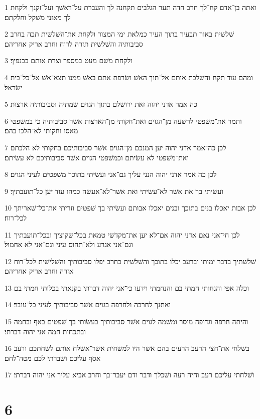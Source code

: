 \par 1 ואתה בן־אדם קח־לך חרב חדה תער הגלבים תקחנה לך והעברת על־ראשׁך ועל־זקנך ולקחת לך מאזני משׁקל וחלקתם׃
\par 2 שׁלשׁית באור תבעיר בתוך העיר כמלאת ימי המצור ולקחת את־השׁלשׁית תכה בחרב סביבותיה והשׁלשׁית תזרה לרוח וחרב אריק אחריהם׃
\par 3 ולקחת משׁם מעט במספר וצרת אותם בכנפיך׃
\par 4 ומהם עוד תקח והשׁלכת אותם אל־תוך האשׁ ושׂרפת אתם באשׁ ממנו תצא־אשׁ אל־כל־בית ישׂראל׃
\par 5 כה אמר אדני יהוה זאת ירושׁלם בתוך הגוים שׂמתיה וסביבותיה ארצות׃
\par 6 ותמר את־משׁפטי לרשׁעה מן־הגוים ואת־חקותי מן־הארצות אשׁר סביבותיה כי במשׁפטי מאסו וחקותי לא־הלכו בהם׃
\par 7 לכן כה־אמר אדני יהוה יען המנכם מן־הגוים אשׁר סביבותיכם בחקותי לא הלכתם ואת־משׁפטי לא עשׂיתם וכמשׁפטי הגוים אשׁר סביבותיכם לא עשׂיתם׃
\par 8 לכן כה אמר אדני יהוה הנני עליך גם־אני ועשׂיתי בתוכך משׁפטים לעיני הגוים׃
\par 9 ועשׂיתי בך את אשׁר לא־עשׂיתי ואת אשׁר־לא־אעשׂה כמהו עוד יען כל־תועבתיך׃
\par 10 לכן אבות יאכלו בנים בתוכך ובנים יאכלו אבותם ועשׂיתי בך שׁפטים וזריתי את־כל־שׁאריתך לכל־רוח׃
\par 11 לכן חי־אני נאם אדני יהוה אם־לא יען את־מקדשׁי טמאת בכל־שׁקוציך ובכל־תועבתיך וגם־אני אגרע ולא־תחוס עיני וגם־אני לא אחמול׃
\par 12 שׁלשׁתיך בדבר ימותו וברעב יכלו בתוכך והשׁלשׁית בחרב יפלו סביבותיך והשׁלישׁית לכל־רוח אזרה וחרב אריק אחריהם׃
\par 13 וכלה אפי והנחותי חמתי בם והנחמתי וידעו כי־אני יהוה דברתי בקנאתי בכלותי חמתי בם׃
\par 14 ואתנך לחרבה ולחרפה בגוים אשׁר סביבותיך לעיני כל־עובר׃
\par 15 והיתה חרפה וגדופה מוסר ומשׁמה לגוים אשׁר סביבותיך בעשׂותי בך שׁפטים באף ובחמה ובתכחות חמה אני יהוה דברתי׃
\par 16 בשׁלחי את־חצי הרעב הרעים בהם אשׁר היו למשׁחית אשׁר־אשׁלח אותם לשׁחתכם ורעב אסף עליכם ושׁברתי לכם מטה־לחם׃
\par 17 ושׁלחתי עליכם רעב וחיה רעה ושׁכלך ודבר ודם יעבר־בך וחרב אביא עליך אני יהוה דברתי׃

\chapter{6}

